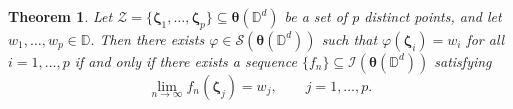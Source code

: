 \documentclass[12pt,reqno]{amsart}
\newtheorem{theorem}{Theorem}[section]
\theoremstyle{remark}
\theoremstyle{definition}
\begin{document}
\begin{theorem}\label{interpolation 3rd}
    Let $\mathcal{Z}=\{\boldsymbol \zeta_1,\ldots,\boldsymbol \zeta_p\}\subseteq \boldsymbol \theta(\mathbb D^d)$ be a set of $p$ distinct points, and let $w_1,\ldots,w_p\in \mathbb D.$ Then there exists $\varphi \in \mathcal{S}(\boldsymbol \theta(\mathbb D^d))$ such that $\varphi(\boldsymbol \zeta_i)=w_i$ for all $i=1,\ldots, p$ if and only if there exists a sequence $\{f_n\}\subseteq \mathcal{I}(\boldsymbol \theta(\mathbb D^d))$ satisfying $$\lim_{n \to \infty} f_n(\boldsymbol \zeta_j)=w_j, \qquad j=1,\ldots, p.$$
\end{theorem}
\end{document}
